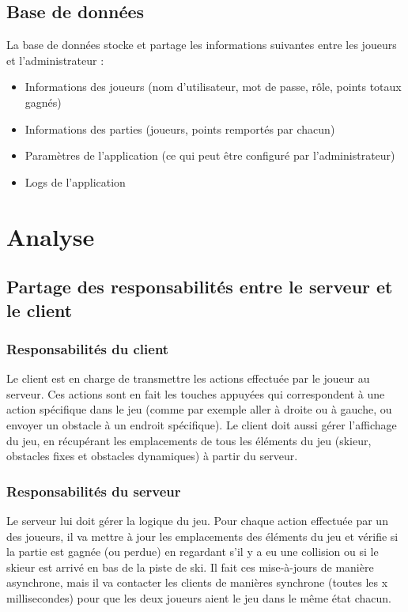 \documentclass[a4paper,12pt]{article}
\begin{document}
	
	\subsection{Base de données}
	La base de données stocke et partage les informations suivantes entre les joueurs et l'administrateur :
	\begin{itemize}
		\item Informations des joueurs (nom d'utilisateur, mot de passe, rôle, points totaux gagnés)
		\item Informations des parties (joueurs, points remportés par chacun)
		\item Paramètres de l'application (ce qui peut être configuré par l'administrateur)
		\item Logs de l'application
	\end{itemize}
	
	
	\section{Analyse}
	
	
	\subsection{Partage des responsabilités entre le serveur et le client}
	
	\subsubsection{Responsabilités du client}
	Le client est en charge de transmettre les actions effectuée par le joueur au serveur. Ces actions sont en fait les touches appuyées qui correspondent à  une action spécifique dans le jeu (comme par exemple aller à droite ou à gauche, ou envoyer un obstacle à un endroit spécifique). Le client doit aussi gérer l'affichage du jeu, en récupérant les emplacements de tous les éléments du jeu (skieur, obstacles fixes et obstacles dynamiques) à partir du serveur.
	
	\subsubsection{Responsabilités du serveur}
	Le serveur lui doit gérer la logique du jeu. Pour chaque action effectuée par un des joueurs, il va mettre à jour les emplacements des éléments du jeu et vérifie si la partie est gagnée (ou perdue) en regardant s'il y a eu une collision ou si le skieur est arrivé en bas de la piste de ski. Il fait ces mise-à-jours de manière asynchrone, mais il va contacter les clients de manières synchrone (toutes les x millisecondes) pour que les deux joueurs aient le jeu dans le même état chacun.
\end{document}
